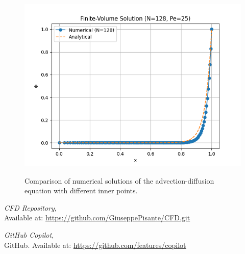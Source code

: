 \documentclass{article}
\begin{document}
\begin{figure}[h!]
\begin{minipage}{0.32\textwidth}
      \label{fig:64}
  \end{minipage} \hfill
  \begin{minipage}{0.32\textwidth}
      \centering
      \includegraphics[width=\textwidth]{FVM_128.png}
      \label{fig:128}
  \end{minipage}
  \caption{Comparison of numerical solutions of the advection-diffusion equation with different inner points.}
  \label{fig:comparison}
\end{figure}








\begin{thebibliography}{9}
    \textit{CFD Repository},\\
    Available at: \url{https://github.com/GiuseppePisante/CFD.git}
    
    \textit{GitHub Copilot},\\
    GitHub. Available at: \url{https://github.com/features/copilot}
  \end{thebibliography}
  
  
\end{document}
